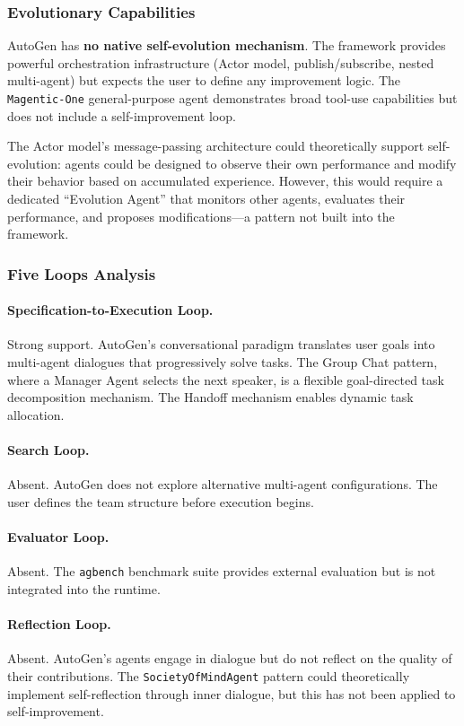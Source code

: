 \subsubsection{Evolutionary Capabilities}

AutoGen has \textbf{no native self-evolution mechanism}. The framework provides powerful orchestration infrastructure (Actor model, publish/subscribe, nested multi-agent) but expects the user to define any improvement logic. The \texttt{Magentic-One} general-purpose agent demonstrates broad tool-use capabilities but does not include a self-improvement loop.

The Actor model's message-passing architecture could theoretically support self-evolution: agents could be designed to observe their own performance and modify their behavior based on accumulated experience. However, this would require a dedicated ``Evolution Agent'' that monitors other agents, evaluates their performance, and proposes modifications---a pattern not built into the framework.

\subsubsection{Five Loops Analysis}

\paragraph{Specification-to-Execution Loop.}
Strong support. AutoGen's conversational paradigm translates user goals into multi-agent dialogues that progressively solve tasks. The Group Chat pattern, where a Manager Agent selects the next speaker, is a flexible goal-directed task decomposition mechanism. The Handoff mechanism enables dynamic task allocation.

\paragraph{Search Loop.}
Absent. AutoGen does not explore alternative multi-agent configurations. The user defines the team structure before execution begins.

\paragraph{Evaluator Loop.}
Absent. The \texttt{agbench} benchmark suite provides external evaluation but is not integrated into the runtime.

\paragraph{Reflection Loop.}
Absent. AutoGen's agents engage in dialogue but do not reflect on the quality of their contributions. The \texttt{SocietyOfMindAgent} pattern could theoretically implement self-reflection through inner dialogue, but this has not been applied to self-improvement.

